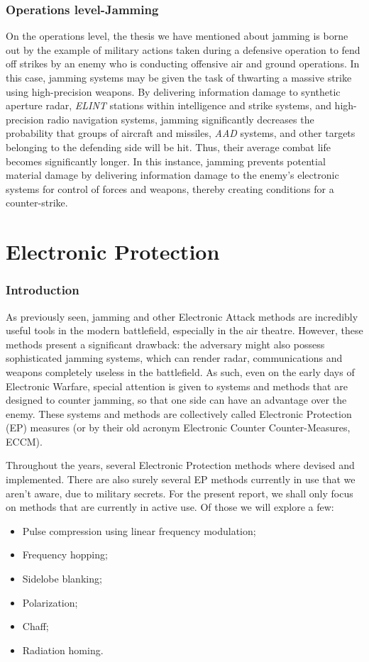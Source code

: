 \documentclass[english,purist]{ist-report}
\begin{document}
\section{Operations level-Jamming}
On the operations level, the thesis we have mentioned about jamming
is borne out by the example of military actions taken during a defensive operation to fend off strikes by an enemy who is conducting offensive air and ground operations. In this case, jamming systems may be given the task of thwarting a massive strike using high-precision weapons. By delivering information damage to synthetic aperture radar, \textit{ELINT} stations within intelligence and strike systems, and high-precision radio navigation systems, jamming significantly decreases the probability that groups of aircraft and
missiles, \textit{AAD} systems, and other targets belonging to the defending side will be hit. Thus, their average combat life becomes significantly longer. In this instance, jamming prevents potential material damage by delivering information damage to the enemy's electronic systems for control of forces and weapons, thereby creating conditions for a counter-strike. 

\part{Electronic Protection}
\section{Introduction}

As previously seen, jamming and other Electronic Attack methods are incredibly useful tools in the modern battlefield, especially in the air theatre. However, these methods present a significant drawback: the adversary might also possess sophisticated jamming systems, which can render radar, communications and weapons completely useless in the battlefield. As such, even on the early days of Electronic Warfare, special attention is given to systems and methods that are designed to counter jamming, so that one side can have an advantage over the enemy. These systems and methods are collectively called Electronic Protection (EP) measures (or by their old acronym Electronic Counter Counter-Measures, ECCM). 

Throughout the years, several Electronic Protection methods where devised and implemented. There are also surely several EP methods currently in use that we aren't aware, due to military secrets. For the present report, we shall only focus on methods that are currently in active use. Of those we will explore a few:
\begin{itemize}
    \item Pulse compression using linear frequency modulation;
    \item Frequency hopping;
    \item Sidelobe blanking;
    \item Polarization;
    \item Chaff;
    \item Radiation homing.
\end{itemize}
\end{document}
